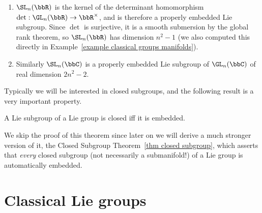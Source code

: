 \begin{example}
    \begin{enumerate}[label=(\alph*)]
        \item $\SL_n(\bbR)$ is the kernel of the determinant homomorphism $\det:\GL_n(\bbR)\to \bbR^\times$, and is therefore a properly embedded Lie subgroup. Since $\det$ is surjective, it is a smooth submersion by the global rank theorem, so $\SL_n(\bbR)$ has dimension $n^2-1$ (we also computed this directly in Example~\ref{example classical groups manifolds}).
        \item Similarly $\SL_n(\bbC)$ is a properly embedded Lie subgroup of $\GL_n(\bbC)$ of real dimension $2n^2-2$.
    \end{enumerate}
\end{example}

Typically we will be interested in closed subgroups, and the following result is a very important property.

\begin{thm}\label{thm 7.21 Lee}
    A Lie subgroup of a Lie group is closed iff it is embedded.
\end{thm}

We skip the proof of this theorem since later on we will derive a much stronger version of it, the Closed Subgroup Theorem~\ref{thm closed subgroup}, which asserts that \emph{every} closed subgroup (not necessarily a submanifold!) of a Lie group is automatically embedded.









\section{Classical Lie groups}\label{sec: classical groups}


